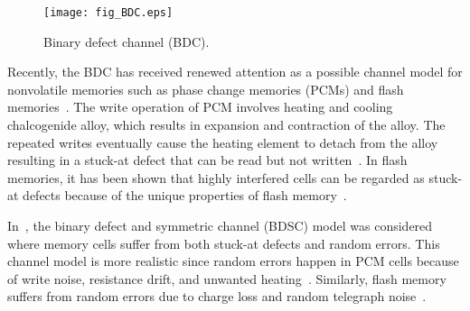 \documentclass[10pt,twocolumn,twoside,submit]{JCNtran}
\begin{document}
	\begin{figure}[!t]
		\centering
		\texttt{[image: fig\_BDC.eps]}
		\vspace{-3mm}
		\caption{Binary defect channel (BDC).}
		\label{fig:BDC}
		\vspace{-5mm}
	\end{figure}

		

	Recently, the BDC has received renewed attention as a possible channel model for nonvolatile memories such as phase change memories (PCMs) and flash memories~\cite{Lastras-Montano2010,Jagmohan2010coding,Hwang2011iterative,Jacobvitz2013,Kim2013coding, Kim2013redundancy, Mahdavifar2015,Kim2016locally}. The write operation of PCM involves heating and cooling chalcogenide alloy, which results in expansion and contraction of the alloy. The repeated writes eventually cause the heating element to detach from the alloy resulting in a stuck-at defect that can be read but not written~\cite{Pirovano2004}. In flash memories, it has been shown that highly interfered cells can be regarded as stuck-at defects because of the unique properties of flash memory~\cite{Kim2014dirtyflash}. 
	
	In~\cite{Tsybakov1975}, the binary defect and symmetric channel (BDSC) model was considered where memory cells suffer from both stuck-at defects and random errors. This channel model is more realistic since random errors happen in PCM cells because of write noise, resistance drift, and unwanted heating~\cite{Pirovano2004}. Similarly, flash memory suffers from random errors due to charge loss and random telegraph noise~\cite{Prall2007}. 
	
\end{document}
